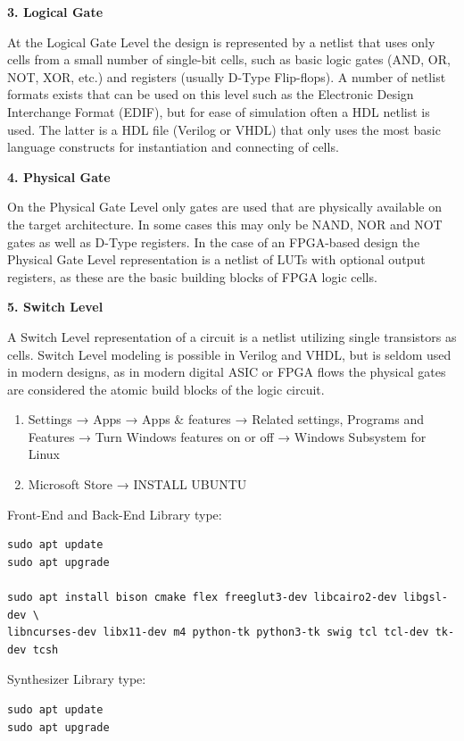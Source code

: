 \documentclass[]{article}
\begin{document}
\textbf{3. Logical Gate}

At the Logical Gate Level the design is represented by a netlist that
uses only cells from a small number of single-bit cells, such as basic
logic gates (AND, OR, NOT, XOR, etc.) and registers (usually D-Type
Flip-flops). A number of netlist formats exists that can be used on this
level such as the Electronic Design Interchange Format (EDIF), but for
ease of simulation often a HDL netlist is used. The latter is a HDL file
(Verilog or VHDL) that only uses the most basic language constructs for
instantiation and connecting of cells.

\textbf{4. Physical Gate}

On the Physical Gate Level only gates are used that are physically
available on the target architecture. In some cases this may only be
NAND, NOR and NOT gates as well as D-Type registers. In the case of an
FPGA-based design the Physical Gate Level representation is a netlist of
LUTs with optional output registers, as these are the basic building
blocks of FPGA logic cells.

\textbf{5. Switch Level}

A Switch Level representation of a circuit is a netlist utilizing single
transistors as cells. Switch Level modeling is possible in Verilog and
VHDL, but is seldom used in modern designs, as in modern digital ASIC or
FPGA flows the physical gates are considered the atomic build blocks of
the logic circuit.

\begin{enumerate}
\def\labelenumi{\arabic{enumi}.}
\item
  Settings → Apps → Apps \& features → Related settings, Programs and
  Features → Turn Windows features on or off → Windows Subsystem for
  Linux
\item
  Microsoft Store → INSTALL UBUNTU
\end{enumerate}

Front-End and Back-End Library type:

\begin{verbatim}
sudo apt update
sudo apt upgrade

sudo apt install bison cmake flex freeglut3-dev libcairo2-dev libgsl-dev \
libncurses-dev libx11-dev m4 python-tk python3-tk swig tcl tcl-dev tk-dev tcsh
\end{verbatim}

Synthesizer Library type:

\begin{verbatim}
sudo apt update
sudo apt upgrade
\end{verbatim}
\end{document}
